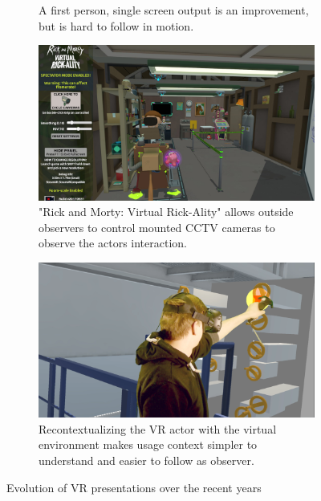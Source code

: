 \begin{figure}[htbp]
\begin{subfigure}[t]{.45\textwidth}
		\caption{A first person, single screen output is an improvement, but is 
			hard to follow in motion.}
	\end{subfigure}
	\newline
	\begin{subfigure}[t]{.45\textwidth}
		\centering
		\includegraphics[width=\textwidth]{gfx/evolution/cctv.png}
		\caption{"Rick and Morty: Virtual Rick-Ality" allows outside observers 
			to control mounted CCTV cameras to observe the actors interaction.}
	\end{subfigure}
	\begin{subfigure}[t]{.45\textwidth}
		\centering
		\includegraphics[width=\textwidth]{gfx/evolution/mr-action.png}
		\caption{Recontextualizing the VR actor with the virtual environment 
		makes usage context simpler to understand and easier to follow as 
		observer.}
	\end{subfigure}
	\caption{Evolution of VR presentations over the recent years}
	\label{fig:evolution:steps}
\end{figure}

